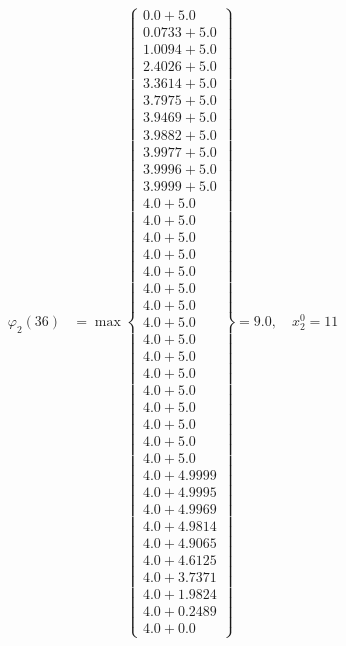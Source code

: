\documentclass{article}
\begin{document}
\begin{align*}
  
\varphi_{2}(36) &= \max \left\{ \begin{array}{c}
0.0 + 5.0 \\
 0.0733 + 5.0 \\
 1.0094 + 5.0 \\
 2.4026 + 5.0 \\
 3.3614 + 5.0 \\
 3.7975 + 5.0 \\
 3.9469 + 5.0 \\
 3.9882 + 5.0 \\
 3.9977 + 5.0 \\
 3.9996 + 5.0 \\
 3.9999 + 5.0 \\
 4.0 + 5.0 \\
 4.0 + 5.0 \\
 4.0 + 5.0 \\
 4.0 + 5.0 \\
 4.0 + 5.0 \\
 4.0 + 5.0 \\
 4.0 + 5.0 \\
 4.0 + 5.0 \\
 4.0 + 5.0 \\
 4.0 + 5.0 \\
 4.0 + 5.0 \\
 4.0 + 5.0 \\
 4.0 + 5.0 \\
 4.0 + 5.0 \\
 4.0 + 5.0 \\
 4.0 + 5.0 \\
 4.0 + 4.9999 \\
 4.0 + 4.9995 \\
 4.0 + 4.9969 \\
 4.0 + 4.9814 \\
 4.0 + 4.9065 \\
 4.0 + 4.6125 \\
 4.0 + 3.7371 \\
 4.0 + 1.9824 \\
 4.0 + 0.2489 \\
 4.0 + 0.0
\end{array} \right\}=9.0,\quad x_{2}^0=11\\
  
  
\end{align*}
\end{document}
